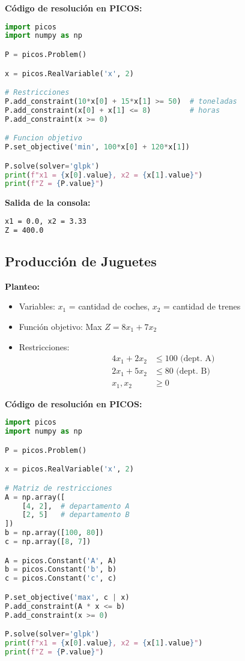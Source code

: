 \documentclass[12pt]{article}
\begin{document}
\textbf{Código de resolución en PICOS:}
\begin{lstlisting}[language=Python]
import picos
import numpy as np

P = picos.Problem()

x = picos.RealVariable('x', 2)

# Restricciones
P.add_constraint(10*x[0] + 15*x[1] >= 50)  # toneladas
P.add_constraint(x[0] + x[1] <= 8)         # horas
P.add_constraint(x >= 0)

# Funcion objetivo
P.set_objective('min', 100*x[0] + 120*x[1])

P.solve(solver='glpk')
print(f"x1 = {x[0].value}, x2 = {x[1].value}")
print(f"Z = {P.value}")
\end{lstlisting}

\textbf{Salida de la consola:}
\begin{lstlisting}[language=bash,backgroundcolor=\color{black},basicstyle=\color{white}\ttfamily,numbers=none]
x1 = 0.0, x2 = 3.33
Z = 400.0
\end{lstlisting}

\subsection{Producción de Juguetes}

\textbf{Planteo:}
\begin{itemize}
\item Variables: $x_1$ = cantidad de coches, $x_2$ = cantidad de trenes
\item Función objetivo: Max $Z = 8x_1 + 7x_2$
\item Restricciones:
  \begin{align*}
  4x_1 + 2x_2 &\leq 100 \text{ (dept. A)} \\
  2x_1 + 5x_2 &\leq 80 \text{ (dept. B)} \\
  x_1, x_2 &\geq 0
  \end{align*}
\end{itemize}

\textbf{Código de resolución en PICOS:}
\begin{lstlisting}[language=Python]
import picos
import numpy as np

P = picos.Problem()

x = picos.RealVariable('x', 2)

# Matriz de restricciones
A = np.array([
    [4, 2],  # departamento A
    [2, 5]   # departamento B
])
b = np.array([100, 80])
c = np.array([8, 7])

A = picos.Constant('A', A)
b = picos.Constant('b', b)
c = picos.Constant('c', c)

P.set_objective('max', c | x)
P.add_constraint(A * x <= b)
P.add_constraint(x >= 0)

P.solve(solver='glpk')
print(f"x1 = {x[0].value}, x2 = {x[1].value}")
print(f"Z = {P.value}")
\end{lstlisting}
\end{document}
